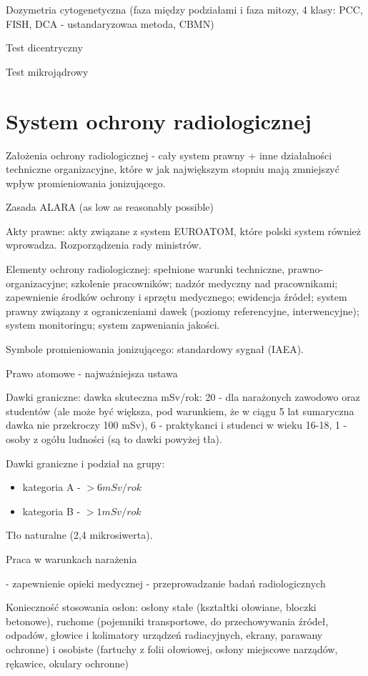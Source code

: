 \documentclass{article}
\begin{document}
Dozymetria cytogenetyczna (faza między podziałami i faza mitozy, 4 klasy: PCC, FISH, DCA - ustandaryzowaa metoda, CBMN)

Test dicentryczny

Test mikrojądrowy

\section{System ochrony radiologicznej}

Założenia ochrony radiologicznej - cały system prawny + inne działalności techniczne organizacyjne, które w jak największym stopniu mają zmniejszyć wpływ promieniowania jonizującego.

Zasada ALARA (as low as reasonably possible)

Akty prawne: akty związane z system EUROATOM, które polski system również wprowadza. Rozporządzenia rady ministrów.

Elementy ochrony radiologicznej: spełnione warunki techniczne, prawno-organizacyjne; szkolenie pracowników; nadzór medyczny nad pracownikami; zapewnienie środków ochrony i sprzętu medycznego; ewidencja źródeł; system prawny związany z ograniczeniami dawek (poziomy referencyjne, interwencyjne); system monitoringu; system zapweniania jakości.

Symbole promieniowania jonizującego: standardowy sygnał (IAEA).

Prawo atomowe - najważniejsza ustawa

Dawki graniczne: dawka skuteczna mSv/rok: 20 - dla narażonych zawodowo oraz studentów (ale może być większa, pod warunkiem, że w ciągu 5 lat sumaryczna dawka nie przekroczy 100 mSv), 6 - praktykanci i studenci w wieku 16-18, 1 - osoby z ogółu ludności (są to dawki powyżej tła).

Dawki graniczne i podział na grupy:
\begin{itemize}
    \item kategoria A - $>6mSv/rok$
    \item kategoria B - $>1mSv/rok$
\end{itemize}

Tło naturalne (2,4 mikrosiwerta).

Praca w warunkach narażenia

- zapewnienie opieki medycznej
- przeprowadzanie badań radiologicznych

Konieczność stosowania osłon: osłony stałe (kształtki ołowiane, bloczki betonowe), ruchome (pojemniki transportowe, do przechowywania źródeł, odpadów, głowice i kolimatory urządzeń radiacyjnych, ekrany, parawany ochronne) i osobiste (fartuchy z folii ołowiowej, osłony miejscowe narządów, rękawice, okulary ochronne)
\end{document}
